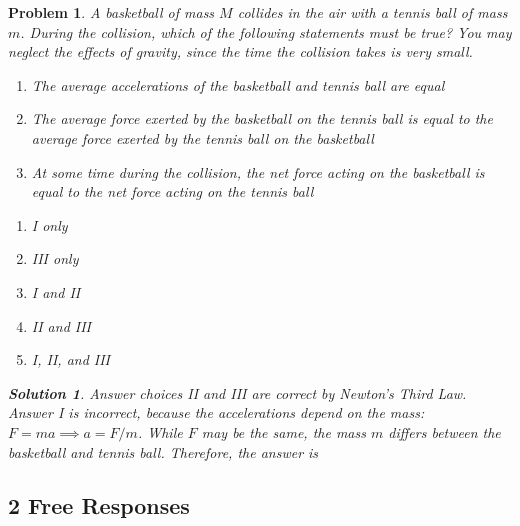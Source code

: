\documentclass[12pt]{article}
\newcommand{\clearpts}{\addtocounter{tpts}{\value{cpts}} \setcounter{cpts}{0}}
\newcommand{\pts}[1]{\clearpts \setcounter{cpts}{#1}}
\newtheorem*{solution}{Solution}
\theoremstyle{mystyle}
\newtheorem{pproblem}{Problem}
\begin{document}
\pts{2} 
\begin{pproblem}
    A basketball of mass $M$ collides in the air with a tennis ball of mass $m$. During the collision, which of the following statements must be true? You may neglect the effects of gravity, since the time the collision takes is very small.
    \begin{enumerate}[label = \Roman*.]
        \item The average accelerations of the basketball and tennis ball are equal
        \item The average force exerted by the basketball on the tennis ball is equal to the average force exerted by the tennis ball on the basketball
        \item At some time during the collision, the net force acting on the basketball is equal to the net force acting on the tennis ball
    \end{enumerate}
    \begin{enumerate}[label=(\Alph*)]
        \item I only
        \item III only
        \item I and II
        \item II and III
        \item I, II, and III
    \end{enumerate}
    \begin{solution}
        Answer choices II and III are correct by Newton's Third Law.
        Answer I is incorrect, because the accelerations depend on the mass: $F=ma\implies a=F/m$.
        While $F$ may be the same, the mass $m$ differs between the basketball and tennis ball.
        Therefore, the answer is 
    \end{solution}
\end{pproblem}


\subsection*{2 Free Responses}
\setcounter{pproblem}{0}
\end{document}
